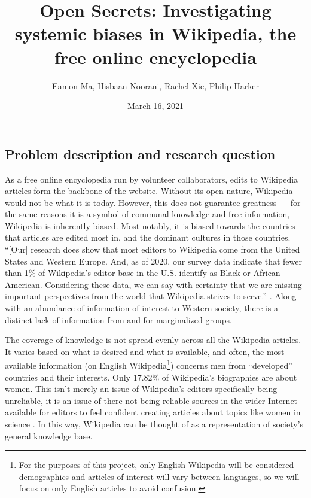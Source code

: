 \documentclass[fontsize=12pt]{article}
\title{Open Secrets: Investigating systemic biases in Wikipedia, the free online encyclopedia}
\author{Eamon Ma, Hisbaan Noorani, Rachel Xie, Philip Harker}
\date{March 16, 2021}
\begin{document}
\maketitle
\begin{multicols}{2}


    \section{Problem description and research question}  %

    As a free online encyclopedia run by volunteer collaborators, edits to Wikipedia articles form the backbone of the website.
    Without its open nature, Wikipedia would not be what it is today.
    However, this does not guarantee greatness --- for the same reasons it is a symbol of communal knowledge and free information, Wikipedia is inherently biased.
    Most notably, it is biased towards the countries that articles are edited most in, and the dominant cultures in those countries.
    ``[Our] research does show that most editors to Wikipedia come from the United States and Western Europe. And, as of 2020, our survey data indicate that fewer than 1\% of Wikipedia’s editor base in the U.S. identify as Black or African American. Considering these data, we can say with certainty that we are missing important perspectives from the world that Wikipedia strives to serve.'' \parencite{Uzzell}.
    Along with an abundance of information of interest to Western society, there is a distinct lack of information from and for marginalized groups.

    The coverage of knowledge is not spread evenly across all the Wikipedia articles.
    It varies based on what is desired and what is available, and often, the most available information (on English Wikipedia\footnote{For the purposes of this project, only English Wikipedia will be considered -- demographics and articles of interest will vary between languages, so we will focus on only English articles to avoid confusion.}) concerns men from ``developed'' countries and their interests.
    Only 17.82\% of Wikipedia's biographies are about women.
    This isn't merely an issue of Wikipedia's editors specifically being unreliable, it is an issue of there not being reliable sources in the wider Internet available for editors to feel confident creating articles about topics like women in science \parencite{Erhart}.
    In this way, Wikipedia can be thought of as a representation of society's general knowledge base.


\end{multicols}
\end{document}
